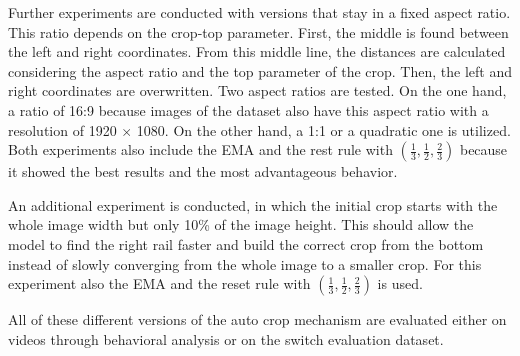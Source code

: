 \noindent Further experiments are conducted with versions that stay in a fixed aspect ratio.
This ratio depends on the crop-top parameter.
First, the middle is found between the left and right coordinates.
From this middle line, the distances are calculated considering the aspect ratio and the top parameter of the crop.
Then, the left and right coordinates are overwritten.
Two aspect ratios are tested.
On the one hand, a ratio of 16:9 because images of the dataset also have this aspect ratio with a resolution of 1920 $\times$ 1080.
On the other hand, a 1:1 or a quadratic one is utilized.
Both experiments also include the \ac{EMA} and the rest rule with $(\frac{1}{3}, \frac{1}{2}, \frac{2}{3})$ because it showed the best results and the most advantageous behavior.

An additional experiment is conducted, in which the initial crop starts with the whole image width but only 10\% of the image height.
This should allow the model to find the right rail faster and build the correct crop from the bottom instead of slowly converging from the whole image to a smaller crop.
For this experiment also the \ac{EMA} and the reset rule with $(\frac{1}{3}, \frac{1}{2}, \frac{2}{3})$ is used.

All of these different versions of the auto crop mechanism are evaluated either on videos through behavioral analysis or on the switch evaluation dataset.

